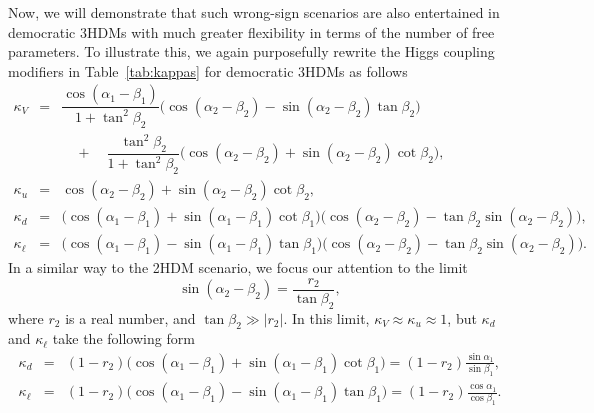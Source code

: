 \documentclass[11pt]{article}
\begin{document}
Now, we will demonstrate that such wrong-sign scenarios are also entertained in democratic 3HDMs with much greater flexibility in terms of the number of free parameters.  
To illustrate this, we again purposefully rewrite the Higgs coupling modifiers in Table~\ref{tab:kappas} for democratic 3HDMs as follows  
%
\begin{subequations}
\label{eq:3hdmkappas}
\begin{eqnarray}
\kappa_V &=& \dfrac{\cos\left(\alpha_1-\beta_1\right)}{1+\tan^2\beta_
2} \bigg( \cos\left( \alpha_2 -\beta_2\right) - \sin\left( \alpha_2 -\beta_2\right) \tan\beta_2 \bigg) \nonumber \\
&& \quad + \quad  \dfrac{\tan^2\beta_2}{1+\tan^2\beta_2} \bigg( \cos\left(\alpha_2-\beta_2\right) + \sin\left(\alpha_2-\beta_2\right) \cot\beta_2\bigg), \\
\kappa_u &=&  \cos\left( \alpha_2 -\beta_2\right) +\sin\left( \alpha_2-\beta_2\right)\cot\beta_2, \\
\kappa_d &=& \bigg( \cos\left( \alpha_1-\beta_1\right) + \sin\left( \alpha_1-\beta_1\right) \cot\beta_1 \bigg) \bigg(\cos\left( \alpha_2-\beta_2\right) - \tan\beta_2 \sin\left(\alpha_2-\beta_2\right) \bigg), \\
\kappa_\ell &=& \bigg( \cos\left( \alpha_1-\beta_1\right) - \sin\left( \alpha_1-\beta_1\right) \tan\beta_1 \bigg) \bigg(\cos\left( \alpha_2-\beta_2\right) - \tan\beta_2 \sin\left(\alpha_2-\beta_2\right) \bigg).
\end{eqnarray}
\end{subequations}
%
In a similar way to the 2HDM scenario, we focus our attention to the limit 
\begin{equation}
\label{e:WS2}
\sin\left(\alpha_2-\beta_2\right) = \dfrac{r_2}{\tan\beta_2},  
\end{equation}
where $r_2$ is a real number, and $\tan\beta_2 \gg \lvert r_2 \rvert$.  
In this limit, $\kappa_V\approx\kappa_u\approx1$, but $\kappa_d$ and $\kappa_\ell$ take the following form
\begin{subequations}
\label{e:kappas3hdmapprox}
\begin{eqnarray}
\kappa_d &=& (1-r_2) \bigg( \cos\left( \alpha_1 -\beta_1\right) + \sin\left( \alpha_1 - \beta_1\right) \cot\beta_1 \bigg) = (1-r_2) \frac{\sin\alpha_1}{\sin\beta_1}, \\
\kappa_\ell &=& (1-r_2) \bigg( \cos\left( \alpha_1 -\beta_1\right) - \sin\left( \alpha_1 - \beta_1\right) \tan\beta_1 \bigg) = (1-r_2) \frac{\cos\alpha_1}{\cos\beta_1}.
\end{eqnarray}
\end{subequations}
\end{document}
